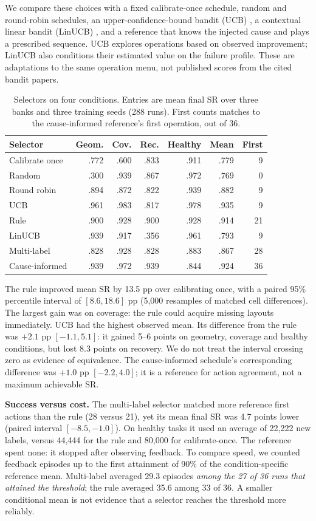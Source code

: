 We compare these choices with a fixed calibrate-once schedule, random and round-robin schedules, an upper-confidence-bound bandit (UCB) \cite{auer2002ucb}, a contextual linear bandit (LinUCB) \cite{linucb}, and a reference that knows the injected cause and plays a prescribed sequence. UCB explores operations based on observed improvement; LinUCB also conditions their estimated value on the failure profile. These are adaptations to the same operation menu, not published scores from the cited bandit papers.
\begin{table}[t]
\centering\caption{Selectors on four conditions. Entries are mean final SR over three banks and three training seeds (288 runs). First counts matches to the cause-informed reference's first operation, out of 36.}\label{tab:selectors}
\begin{tabular}{@{}lrrrrrr@{}}\toprule
Selector & Geom. & Cov. & Rec. & Healthy & Mean & First\\\midrule
Calibrate once & .772 & .600 & .833 & .911 & .779 & 9\\
Random & .300 & .939 & .867 & .972 & .769 & 0\\
Round robin & .894 & .872 & .822 & .939 & .882 & 9\\
UCB & .961 & .983 & .817 & .978 & .935 & 9\\
Rule & .900 & .928 & .900 & .928 & .914 & 21\\
LinUCB & .939 & .917 & .356 & .961 & .793 & 9\\
Multi-label & .828 & .928 & .828 & .883 & .867 & 28\\
Cause-informed & .939 & .972 & .939 & .844 & .924 & 36\\\bottomrule
\end{tabular}
\end{table}
The rule improved mean SR by 13.5 pp over calibrating once, with a paired 95\% percentile interval of $[8.6,18.6]$ pp (5,000 resamples of matched cell differences). The largest gain was on coverage: the rule could acquire missing layouts immediately. UCB had the highest observed mean. Its difference from the rule was $+2.1$ pp $[-1.1,5.1]$: it gained 5--6 points on geometry, coverage and healthy conditions, but lost 8.3 points on recovery. We do not treat the interval crossing zero as evidence of equivalence. The cause-informed schedule's corresponding difference was $+1.0$ pp $[-2.2,4.0]$; it is a reference for action agreement, not a maximum achievable SR.

\textbf{Success versus cost.} The multi-label selector matched more reference first actions than the rule (28 versus 21), yet its mean final SR was 4.7 points lower (paired interval $[-8.5,-1.0]$). On healthy tasks it used an average of 22,222 new labels, versus 44,444 for the rule and 80,000 for calibrate-once. The reference spent none: it stopped after observing feedback. To compare speed, we counted feedback episodes up to the first attainment of 90\% of the condition-specific reference mean. Multi-label averaged 29.3 episodes \emph{among the 27 of 36 runs that attained the threshold}; the rule averaged 35.6 among 33 of 36. A smaller conditional mean is not evidence that a selector reaches the threshold more reliably.

